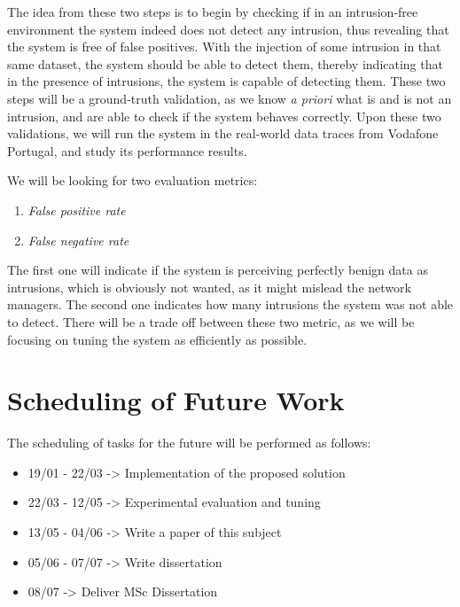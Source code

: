 \documentclass[runningheads,a4paper]{llncs}
\begin{document}
The idea from these two steps is to begin by checking if in an intrusion-free environment the system indeed does not detect any intrusion, thus revealing that the system is free of false positives. With the injection of some intrusion in that same dataset, the system should be able to detect them, thereby indicating that in the presence of intrusions, the system is capable of detecting them. These two steps will be a ground-truth validation, as we know \textit{a priori} what is and is not an intrusion, and are able to check if the system behaves correctly. Upon these two validations, we will run the system in the real-world data traces from Vodafone Portugal, and study its performance results.

We will be looking for two evaluation metrics:
\begin{enumerate}
\item \textit{False positive rate}
\item \textit{False negative rate}
\end{enumerate}

The first one will indicate if the system is perceiving perfectly benign data as intrusions, which is obviously not wanted, as it might mislead the network managers. The second one indicates how many intrusions the system was not able to detect. There will be a trade off between these two metric, as we will be focusing on tuning the system as efficiently as possible. 


\section{Scheduling of Future Work}\label{sec:schedule}

The scheduling of tasks for the future will be performed as follows:

\begin{itemize}
\item 19/01 - 22/03  -> Implementation of the proposed solution
\item 22/03 - 12/05 -> Experimental evaluation and tuning 
\item 13/05 - 04/06 -> Write a paper of this subject
\item 05/06 - 07/07 -> Write dissertation
\item 08/07 -> Deliver MSc Dissertation
\end{itemize}
\end{document}
